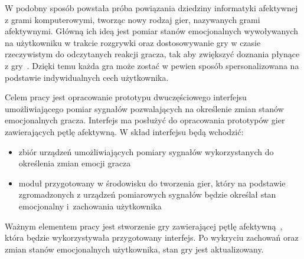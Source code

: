 W podobny sposób powstała próba powiązania dziedziny informatyki afektywnej z grami komputerowymi, tworząc nowy rodzaj gier, nazywanych grami afektywnymi. Główną ich ideą jest pomiar stanów emocjonalnych wywoływanych na użytkowniku w trakcie rozgrywki oraz dostosowywanie gry w czasie rzeczywistym do odczytanych reakcji gracza, tak aby zwiększyć doznania płynące z gry~\cite{kotsia_affective_gaming}. Dzięki temu każda gra może zostać w pewien sposób spersonalizowana na podstawie indywidualnych cech użytkownika. 

Celem pracy jest opracowanie prototypu dwuczęściowego interfejsu umożliwiającego pomiar sygnałów pozwalających na określenie zmian stanów emocjonalnych gracza. Interfejs ma posłużyć do opracowania prototypów gier zawierających pętlę afektywną. W skład interfejsu będą wchodzić:
\begin{itemize}
	\item zbiór urządzeń umożliwiających pomiary sygnałów wykorzystanych do określenia zmian emocji gracza
	\item moduł przygotowany w środowisku do tworzenia gier, który na podstawie zgromadzonych z urządzeń pomiarowych sygnałów będzie określał stan emocjonalny i~zachowania użytkownika
\end{itemize}
Ważnym elementem pracy jest stworzenie gry zawierającej pętlę afektywną~\cite{affective_loop_experiences}, która będzie wykorzystywała przygotowany interfejs. Po wykryciu zachowań oraz zmian stanów emocjonalnych użytkownika, stan gry jest aktualizowany.

